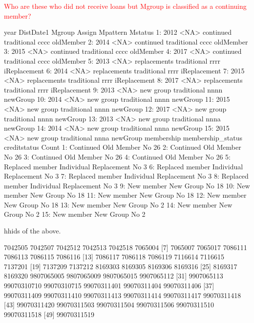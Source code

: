 \textcolor{red}{Who are these who did not receive loans but \textsf{Mgroup} is classified as a continuing member?}
\begin{Schunk}
\begin{Soutput}
    year DistDate1       Mgroup      Assign Mpattern      Mstatus
 1: 2012      <NA>    continued traditional     cccc    oldMember
 2: 2014      <NA>    continued traditional     cccc    oldMember
 3: 2015      <NA>    continued traditional     cccc    oldMember
 4: 2017      <NA>    continued traditional     cccc    oldMember
 5: 2013      <NA> replacements traditional     rrrr iReplacement
 6: 2014      <NA> replacements traditional     rrrr iReplacement
 7: 2015      <NA> replacements traditional     rrrr iReplacement
 8: 2017      <NA> replacements traditional     rrrr iReplacement
 9: 2013      <NA>    new group traditional     nnnn     newGroup
10: 2014      <NA>    new group traditional     nnnn     newGroup
11: 2015      <NA>    new group traditional     nnnn     newGroup
12: 2017      <NA>    new group traditional     nnnn     newGroup
13: 2013      <NA>    new group traditional     nnna     newGroup
14: 2014      <NA>    new group traditional     nnna     newGroup
15: 2015      <NA>    new group traditional     nnna     newGroup
         membership      membership_status creditstatus Count
 1:       Continued             Old Member           No    26
 2:       Continued             Old Member           No    26
 3:       Continued             Old Member           No    26
 4:       Continued             Old Member           No    26
 5: Replaced member Individual Replacement           No     3
 6: Replaced member Individual Replacement           No     3
 7: Replaced member Individual Replacement           No     3
 8: Replaced member Individual Replacement           No     3
 9:      New member              New Group           No    18
10:      New member              New Group           No    18
11:      New member              New Group           No    18
12:      New member              New Group           No    18
13:      New member              New Group           No     2
14:      New member              New Group           No     2
15:      New member              New Group           No     2
\end{Soutput}
\end{Schunk}
\textsf{hhid}s of the above.
\begin{Schunk}
\begin{Soutput}
 [1]     7042505     7042507     7042512     7042513     7042518     7065004
 [7]     7065007     7065017     7086111     7086113     7086115     7086116
[13]     7086117     7086118     7086119     7116614     7116615     7137201
[19]     7137209     7137212     8169303     8169305     8169306     8169316
[25]     8169317     8169320  9807065005  9807065009  9807065015  9907065112
[31]  9907065113 99070310710 99070310715 99070311401 99070311404 99070311406
[37] 99070311409 99070311410 99070311413 99070311414 99070311417 99070311418
[43] 99070311420 99070311503 99070311504 99070311506 99070311510 99070311518
[49] 99070311519
\end{Soutput}
\end{Schunk}
